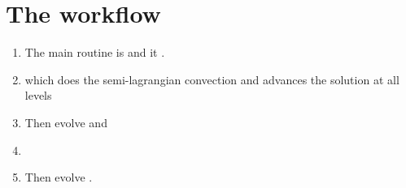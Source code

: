 \documentclass[11pt]{article}
\begin{document}
\section{The workflow}
\begin{enumerate}
\item The main routine is 
\href{https://github.com/nataraj2/MultiphaseAMReX/blob/master/amrex/Tutorials/Amr/MultiphaseAMR_LJCF/Source/fmain.F90}{} and it 
\href{https://github.com/nataraj2/MultiphaseAMReX/blob/master/amrex/Tutorials/Amr/MultiphaseAMR_LJCF/Source/fmain.F90#L19}{}.

\item \href{https://github.com/nataraj2/MultiphaseAMReX/blob/master/amrex/Tutorials/Amr/MultiphaseAMR_LJCF/Source/evolve_mod.F90#L65}{}
which does the semi-lagrangian convection and advances the solution at all levels
\item Then evolve \href{https://github.com/nataraj2/MultiphaseAMReX/blob/master/amrex/Tutorials/Amr/MultiphaseAMR_LJCF/Source/evolve_mod.F90#L106}{ } and
\item \href{https://github.com/nataraj2/MultiphaseAMReX/blob/master/amrex/Tutorials/Amr/MultiphaseAMR_LJCF/Source/evolve_mod.F90#L108}{}
\item Then evolve \href{https://github.com/nataraj2/MultiphaseAMReX/blob/master/amrex/Tutorials/Amr/MultiphaseAMR_LJCF/Source/evolve_mod.F90#L113-L119}{}.
\end{enumerate}
\end{document}

